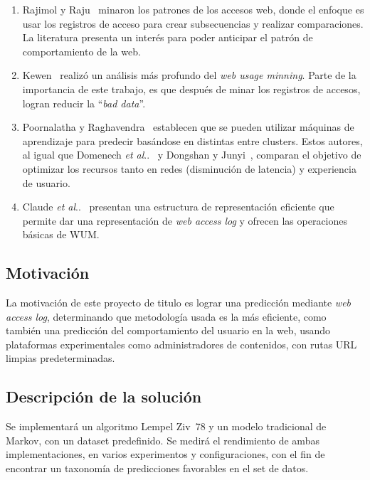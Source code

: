 \documentclass{udparticle}
\makeatletter
\DeclareRobustCommand\onedot{\futurelet\@let@token\@onedot}
\newcommand\@onedot{\ifx\@let@token.\else.\null\fi\xspace}
\newcommand\etal{\emph{et al}\onedot}
\makeatother
\begin{document}
\begin{enumerate}
  \item Rajimol y Raju~\cite{rajimol} minaron los patrones de los accesos web, donde el enfoque es usar los registros de acceso para crear subsecuencias y realizar comparaciones.
  La literatura presenta un interés para poder anticipar el patrón de comportamiento de la web.

  \item Kewen~\cite{kewen} realizó un análisis más profundo del \emph{web usage minning}.
  Parte de la importancia de este trabajo, es que después de minar los registros de accesos, logran reducir la ``\emph{bad data}''.

  \item Poornalatha y Raghavendra~\cite{Poornalatha2012} establecen que se pueden utilizar máquinas de aprendizaje para predecir basándose en distintas entre clusters. Estos autores, al igual que Domenech \etal~\cite{domenech} y Dongshan y Junyi~\cite{tmmd}, comparan el objetivo de optimizar los recursos tanto en redes (disminución de latencia) y experiencia de usuario.

  \item Claude \etal~\cite{BWT} presentan una estructura de representación eficiente que permite dar una representación de \emph{web access log} y ofrecen las operaciones básicas de WUM.
\end{enumerate}


\subsection{Motivación}

La motivación de este proyecto de titulo es lograr una predicción mediante \emph{web access log}, determinando que metodología usada es la más eficiente, como también una predicción del comportamiento del usuario en la web, usando plataformas experimentales como administradores de contenidos, con rutas URL limpias predeterminadas.


\subsection{Descripción de la solución }

Se implementará un algoritmo Lempel Ziv~78 y un modelo tradicional de Markov, con un dataset predefinido.
Se medirá el rendimiento de ambas implementaciones, en varios experimentos y configuraciones, con el fin de encontrar un taxonomía de predicciones favorables en el set de datos.
\end{document}
